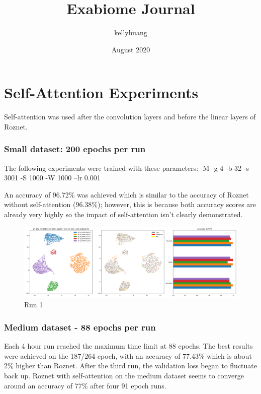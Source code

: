 \documentclass{article}
\title{Exabiome Journal}
\author{kellyhuang }
\date{August 2020}
\begin{document}
\maketitle

\section{Self-Attention Experiments}
Self-attention was used after the convolution layers and before the linear layers of Roznet. 

\subsubsection*{Small dataset: 200 epochs per run}
The following experiments were trained with these parameters: 
\newline
-M -g 4 -b 32 -s 3001 -S 1000 -W 1000 --lr 0.001

An accuracy of 96.72\% was achieved which is similar to the accuracy of Roznet without self-attention (96.38\%); however, this is because both accuracy scores are already very highly so the impact of self-attention isn't clearly demonstrated. 

\begin{figure}[h!]
  \includegraphics[width=\linewidth]{new_journal/figures/experiments/roznet_attn/small/e200.png}
  \caption{Run 1}
\end{figure}

\clearpage

\subsubsection*{Medium dataset - 88 epochs per run}
Each 4 hour run reached the maximum time limit at 88 epochs. The best results were achieved on the 187/264 epoch, with an accuracy of 77.43\% which is about 2\% higher than Roznet. After the third run, the validation loss began to fluctuate back up. Roznet with self-attention on the medium dataset seems to converge around an accuracy of 77\% after four 91 epoch runs.
\end{document}
